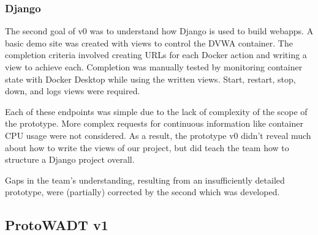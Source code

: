 \documentclass[../design-document.tex]{subfiles}
\begin{document}
\subsubsection{Django}
The second goal of v0 was to understand how Django is used to build webapps. A basic demo site was created with views to control the DVWA container. The completion criteria involved creating URLs for each Docker action and writing a view to achieve each. Completion was manually tested by monitoring container state with Docker Desktop while using the written views. Start, restart, stop, down, and logs views were required.

Each of these endpoints was simple due to the lack of complexity of the scope of the prototype. More complex requests for continuous information like container CPU usage were not considered. As a result, the prototype v0 didn't reveal much about how to write the views of our project, but did teach the team how to structure a Django project overall.

Gaps in the team's understanding, resulting from an insufficiently detailed prototype, were (partially) corrected by the second which was developed.

\subsection{ProtoWADT v1}
\end{document}
